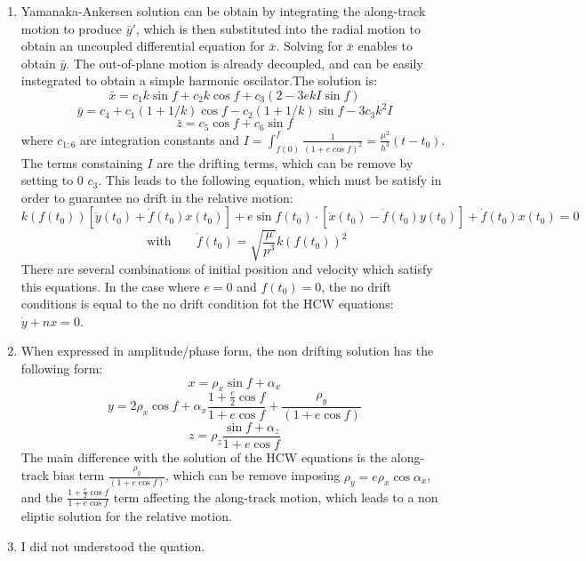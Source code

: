 \documentclass[a4paper]{article}
\begin{document}
\begin{enumerate}[label=\emph{\alph*)}]
  \item Yamanaka-Ankersen solution can be obtain by integrating the along-track motion to produce $\bar{y}'$, which is then substituted into the radial motion to obtain an uncoupled differential equation for $\bar{x}$. Solving for $\bar{x}$ enables to obtain  $\bar{y}$. The out-of-plane motion is already decoupled, and can be easily instegrated to obtain a simple harmonic oscilator.The solution is:
   \[\bar{x} = c_1 k \sin{f}+c_2 k \cos{f} + c_3 (2 - 3 e k I\sin{f})\]
   \[\bar{y} = c_4 + c_1 (1+1/k)\cos{f} - c_2 (1+1/k) \sin{f} - 3 c_3 k^2 I \]
   \[\bar{z} = c_5 \cos{f} + c_6 \sin{f}\]
   where $c_{1:6}$ are integration constants and $I = \int_{f(0)}^{f}{\frac{1}{(1+e\cos{f})^2}} = \frac{\mu^2}{h^3}(t-t_0)$. The terms constaining $I$ are the drifting terms, which can be remove by setting to 0 $c_3$. This leads to the following equation, which must be satisfy in order to guarantee no drift in the relative motion:
   \[k(f(t_0)) [\dot{y}(t_0)+\dot{f}(t_0)x(t_0)] + e \sin{f(t_0)}\cdot [\dot{x}(t_0) - \dot{f}(t_0)y(t_0)] + \dot{f}(t_0)x(t_0) = 0 \]
   \[ \qquad  \mathrm{with} \qquad \dot{f}(t_0) = \sqrt{\frac{\mu}{p^3}}k(f(t_0))^2  \]
   There are several combinations of initial position and velocity which satisfy this equations. In the case where $e=0$ and $f(t_0)=0$, the no drift conditions is equal to the no drift condition fot the HCW equations: $\dot{y}+nx=0$.
  \item When expressed in amplitude/phase form, the non drifting solution has the following form:
   \[x = \rho_x \sin{f+\alpha_x} \]
   \[y = 2 \rho_x \cos{f+\alpha_x} \frac{1+\frac{e}{2}\cos{f}}{1+e\cos{f}} + \frac{\rho_y}{(1+e\cos{f})} \]
   \[z = \rho_z \frac{\sin{f+\alpha_z}}{1+e\cos{f}} \]
   The main difference with the solution of the HCW equations is the along-track bias term  $\frac{\rho_y}{(1+e\cos{f})}$, which can be remove imposing $\rho_y=e\rho_x\cos{\alpha_x}$,  and the $\frac{1+\frac{e}{2}\cos{f}}{1+e\cos{f}}$ term affecting the along-track motion, which leads to a non eliptic solution for the relative motion.
 
  \item I did not understood the quation. 


  
\end{enumerate}
\end{document}
